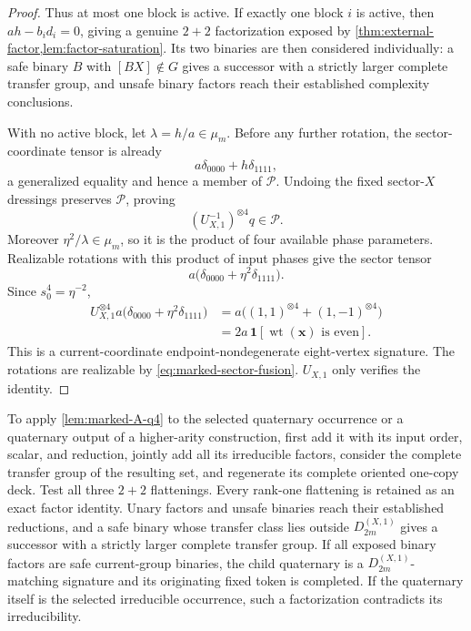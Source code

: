 \documentclass[11pt,letterpaper,onecolumn]{article}
\theoremstyle{plain}
\theoremstyle{definition}
\theoremstyle{remark}
\newcommand{\cP}{\mathscr P}
\newcommand{\DihXone}[1]{{D_{#1}^{(X,1)}}}
\newcommand{\wt}{\operatorname{wt}}
\newcommand{\one}{\mathbf 1}
\begin{document}
\begin{proof}
Thus at most one block is active.  If exactly one block \(i\) is active,
then \(ah-b_id_i=0\), giving a genuine \(2+2\) factorization exposed by
\cref{thm:external-factor,lem:factor-saturation}.  Its two binaries are
then considered individually: a safe binary \(B\) with \([BX]\notin G\) gives a successor with a strictly larger complete transfer group,
and unsafe binary factors reach their established
complexity conclusions.

With no active block, let \(\lambda=h/a\in\mu_m\).  Before any further
rotation, the sector-coordinate tensor is already
\[
 a\delta_{0000}+h\delta_{1111},
\]
a generalized equality and hence a member of \(\cP\).  Undoing the fixed
sector-\(X\) dressings preserves \(\cP\), proving
\[
 (U_{X,1}^{-1})^{\otimes4}q\in\cP.
\]
Moreover \(\eta^2/\lambda\in\mu_m\), so it is the product of four available
phase parameters.  Realizable rotations with this product of input phases give the
sector tensor
\[
 a\bigl(\delta_{0000}+\eta^2\delta_{1111}\bigr).
\]
Since \(s_0^4=\eta^{-2}\),
\begin{align*}
 U_{X,1}^{\otimes4}
 a\bigl(\delta_{0000}+\eta^2\delta_{1111}\bigr)
 &=
 a\bigl((1,1)^{\otimes4}+(1,-1)^{\otimes4}\bigr)\\
 &=2a\,\one[\wt({\mathbf{x}})\text{ is even}].
\end{align*}
This is a current-coordinate endpoint-nondegenerate eight-vertex signature.  The rotations are
realizable by \cref{eq:marked-sector-fusion}. \(U_{X,1}\) only verifies
the identity.
\end{proof}

To apply \cref{lem:marked-A-q4} to the selected quaternary occurrence
or a quaternary output of a higher-arity construction, first add it with its input order,
scalar, and reduction, jointly add all its irreducible factors, consider the complete transfer group of the resulting set, and regenerate its complete oriented one-copy deck.  Test all
three \(2+2\) flattenings.  Every rank-one flattening is retained as
an exact factor identity.  Unary factors and unsafe binaries
reach their established reductions, and a safe binary whose transfer class lies outside
\(\DihXone{2m}\) gives a successor with a strictly larger complete transfer group.  If all exposed binary factors
are safe current-group binaries, the child quaternary is a \(\DihXone{2m}\)-matching signature and its originating fixed token is completed. If the quaternary itself is
the selected irreducible occurrence, such a factorization contradicts its
irreducibility.
\end{document}
